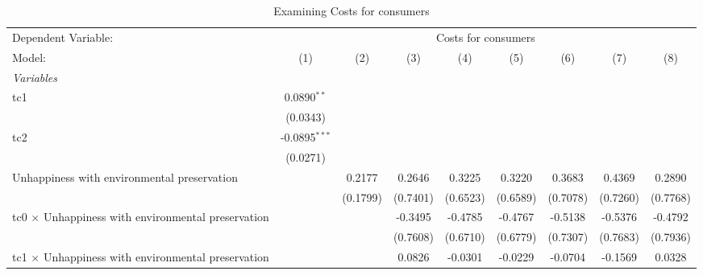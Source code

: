 
\begin{table}[htbp]
   \caption{Examining Costs for consumers}
   \centering
   \begin{tabular}{lcccccccc}
      \tabularnewline \midrule \midrule
      Dependent Variable: & \multicolumn{8}{c}{Costs for consumers}\\
      Model:                                                    & (1)             & (2)      & (3)      & (4)            & (5)            & (6)            & (7)            & (8)\\  
      \midrule
      \emph{Variables}\\
      tc1                                                       & 0.0890$^{**}$   &          &          &                &                &                &                &   \\   
                                                                & (0.0343)        &          &          &                &                &                &                &   \\   
      tc2                                                       & -0.0895$^{***}$ &          &          &                &                &                &                &   \\   
                                                                & (0.0271)        &          &          &                &                &                &                &   \\   
      Unhappiness with environmental preservation               &                 & 0.2177   & 0.2646   & 0.3225         & 0.3220         & 0.3683         & 0.4369         & 0.2890\\   
                                                                &                 & (0.1799) & (0.7401) & (0.6523)       & (0.6589)       & (0.7078)       & (0.7260)       & (0.7768)\\   
      tc0 $\times$ Unhappiness with environmental preservation  &                 &          & -0.3495  & -0.4785        & -0.4767        & -0.5138        & -0.5376        & -0.4792\\   
                                                                &                 &          & (0.7608) & (0.6710)       & (0.6779)       & (0.7307)       & (0.7683)       & (0.7936)\\   
      tc1 $\times$ Unhappiness with environmental preservation  &                 &          & 0.0826   & -0.0301        & -0.0229        & -0.0704        & -0.1569        & 0.0328\\   

\end{tabular}
\end{table}
